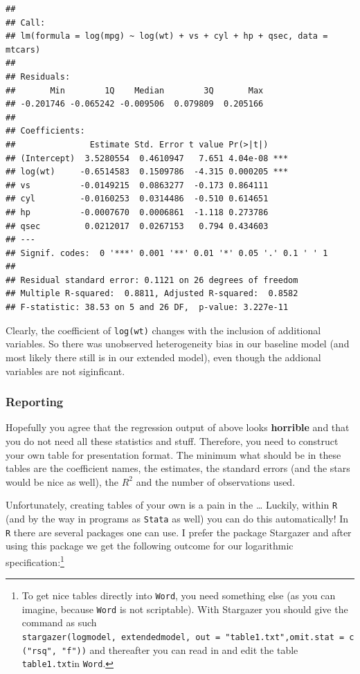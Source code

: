 \documentclass[]{article}
\let\rmarkdownfootnote\footnote%
\def\footnote{\protect\rmarkdownfootnote}
\theoremstyle{definition}
\theoremstyle{definition}
\theoremstyle{definition}
\theoremstyle{remark}
\begin{document}
\begin{verbatim}
## 
## Call:
## lm(formula = log(mpg) ~ log(wt) + vs + cyl + hp + qsec, data = mtcars)
## 
## Residuals:
##       Min        1Q    Median        3Q       Max 
## -0.201746 -0.065242 -0.009506  0.079809  0.205166 
## 
## Coefficients:
##               Estimate Std. Error t value Pr(>|t|)    
## (Intercept)  3.5280554  0.4610947   7.651 4.04e-08 ***
## log(wt)     -0.6514583  0.1509786  -4.315 0.000205 ***
## vs          -0.0149215  0.0863277  -0.173 0.864111    
## cyl         -0.0160253  0.0314486  -0.510 0.614651    
## hp          -0.0007670  0.0006861  -1.118 0.273786    
## qsec         0.0212017  0.0267153   0.794 0.434603    
## ---
## Signif. codes:  0 '***' 0.001 '**' 0.01 '*' 0.05 '.' 0.1 ' ' 1
## 
## Residual standard error: 0.1121 on 26 degrees of freedom
## Multiple R-squared:  0.8811, Adjusted R-squared:  0.8582 
## F-statistic: 38.53 on 5 and 26 DF,  p-value: 3.227e-11
\end{verbatim}

Clearly, the coefficient of \texttt{log(wt)} changes with the inclusion
of additional variables. So there was unobserved heterogeneity bias in
our baseline model (and most likely there still is in our extended
model), even though the addional variables are not siginficant.

\subsubsection{Reporting}\label{reporting}

Hopefully you agree that the regression output of above looks
\textbf{horrible} and that you do not need all these statistics and
stuff. Therefore, you need to construct your own table for presentation
format. The minimum what should be in these tables are the coefficient
names, the estimates, the standard errors (and the stars would be nice
as well), the \(R^2\) and the number of observations used.

Unfortunately, creating tables of your own is a pain in the \ldots{}
Luckily, within \texttt{R} (and by the way in programs as \texttt{Stata}
as well) you can do this automatically! In \texttt{R} there are several
packages one can use. I prefer the package Stargazer and after using
this package we get the following outcome for our logarithmic
specification:\footnote{To get nice tables directly into \texttt{Word},
  you need something else (as you can imagine, because \texttt{Word} is
  not scriptable). With Stargazer you should give the command as such
  \texttt{stargazer(logmodel,\ extendedmodel,\ out\ =\ "table1.txt",omit.stat\ =\ c("rsq",\ "f"))}
  and thereafter you can read in and edit the table
  \texttt{table1.txt}in \texttt{Word}.}
\end{document}
